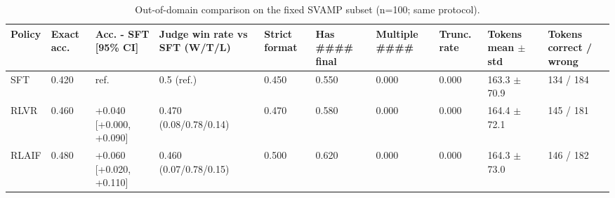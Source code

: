 \begin{table}[t]
\centering
\small
\caption{Out-of-domain comparison on the fixed SVAMP subset (n=100; same protocol).}
\begin{tabular}{llllllllll}
\toprule
Policy & Exact acc. & Acc. - SFT [95\% CI] & Judge win rate vs SFT (W/T/L) & Strict format & Has #### final & Multiple #### & Trunc. rate & Tokens mean $\pm$ std & Tokens correct / wrong \\
\midrule
SFT & 0.420 & ref. & 0.5 (ref.) & 0.450 & 0.550 & 0.000 & 0.000 & 163.3 $\pm$ 70.9 & 134 / 184 \\
RLVR & 0.460 & +0.040 [+0.000, +0.090] & 0.470 (0.08/0.78/0.14) & 0.470 & 0.580 & 0.000 & 0.000 & 164.4 $\pm$ 72.1 & 145 / 181 \\
RLAIF & 0.480 & +0.060 [+0.020, +0.110] & 0.460 (0.07/0.78/0.15) & 0.500 & 0.620 & 0.000 & 0.000 & 164.3 $\pm$ 73.0 & 146 / 182 \\
\bottomrule
\end{tabular}
\end{table}
